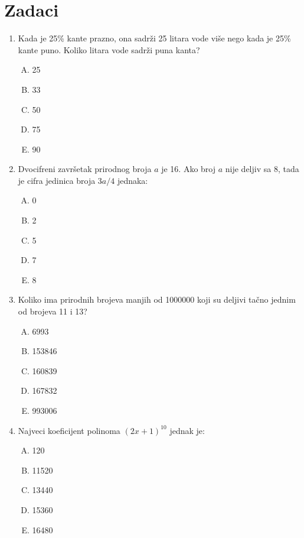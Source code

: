 \documentclass[a4paper,12pt]{report}
\begin{document}
\section{Zadaci}

\begin{enumerate}[1.]
\item Kada je 25\% kante prazno, ona sadr\v{z}i 25 litara vode vi\v{s}e nego kada je 25\% kante puno. Koliko litara vode sadr\v{z}i puna kanta?
\begin{multicols}{5}
\begin{enumerate}[A)]
\item 25 \item 33 \item 50 \item 75 \item 90
\end{enumerate}
\end{multicols}

\item Dvocifreni zavr\v{s}etak prirodnog broja $a$ je 16. Ako broj $a$ nije deljiv sa 8, tada je cifra jedinica broja $3a/4$ jednaka:
\begin{multicols}{5}
\begin{enumerate}[A)]
\item 0 \item 2 \item 5 \item 7 \item 8
\end{enumerate}
\end{multicols}

\item Koliko ima prirodnih brojeva manjih od 1000000 koji su deljivi ta\v{c}no jednim od brojeva 11 i 13?
\begin{multicols}{5}
\begin{enumerate}[A)]
\item 6993 \item 153846 \item 160839 \item 167832 \item 993006
\end{enumerate}
\end{multicols}

\item Najveci koeficijent polinoma $(2x + 1)^{10} $ jednak je:
\begin{multicols}{5}
\begin{enumerate}[A)]
\item 120 \item 11520 \item 13440 \item 15360 \item 16480
\end{enumerate}
\end{multicols} 


\end{enumerate}
\end{document}

